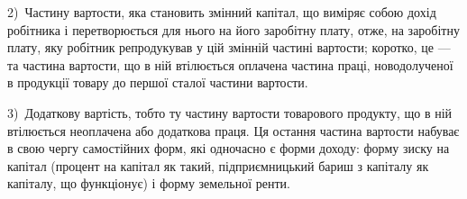 2)~Частину вартости, яка становить змінний капітал, що виміряє собою
дохід робітника і перетворюється для нього на його заробітну плату, отже, на
заробітну плату, яку робітник репродукував у цій змінній частині вартости;
коротко, це — та частина вартости, що в ній втілюється оплачена частина
праці, новодолученої в продукції товару до першої сталої частини вартости.

3)~Додаткову вартість, тобто ту частину вартости товарового продукту,
що в ній втілюється неоплачена або додаткова праця. Ця остання частина
вартости набуває в свою чергу самостійних форм, які одночасно є форми
доходу: форму зиску на капітал (процент на капітал як такий, підприємницький
бариш з капіталу як капіталу, що функціонує) і форму земельної ренти.
\parbreak{}  %
